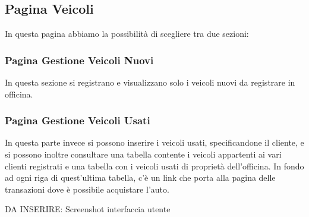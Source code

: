 \documentclass[a4paper,12pt]{report}
\begin{document}
\subsection*{Pagina Veicoli}
In questa pagina abbiamo la possibilità di scegliere tra due sezioni:

\subsubsection*{Pagina Gestione Veicoli Nuovi}
In questa sezione si registrano e visualizzano solo i veicoli nuovi da registrare in officina.

\subsubsection*{Pagina Gestione Veicoli Usati}
In questa parte invece si possono inserire i veicoli usati, specificandone il cliente, e si possono inoltre 
%
consultare una tabella contente i veicoli appartenti ai vari clienti registrati e una tabella con i veicoli
%
usati di proprietà dell'officina. In fondo ad ogni riga di quest'ultima tabella, c'è un link che porta alla pagina
% 
delle transazioni dove è possibile acquistare l'auto.

DA INSERIRE: Screenshot interfaccia utente
\end{document}
